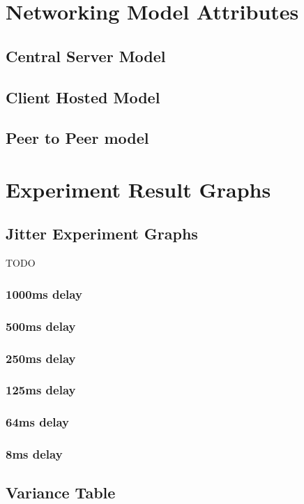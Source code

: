 \chapter{Networking Model Attributes}\label{app:attributes}

\section{Central Server Model}

\newpage

\section{Client Hosted Model}

\newpage

\section{Peer to Peer model}



\chapter{Experiment Result Graphs}

\section{Jitter Experiment Graphs}
TODO

\subsection{1000ms delay}

\subsection{500ms delay}

\subsection{250ms delay}

\subsection{125ms delay}

\subsection{64ms delay}

\subsection{8ms delay}

\section{Variance Table}
